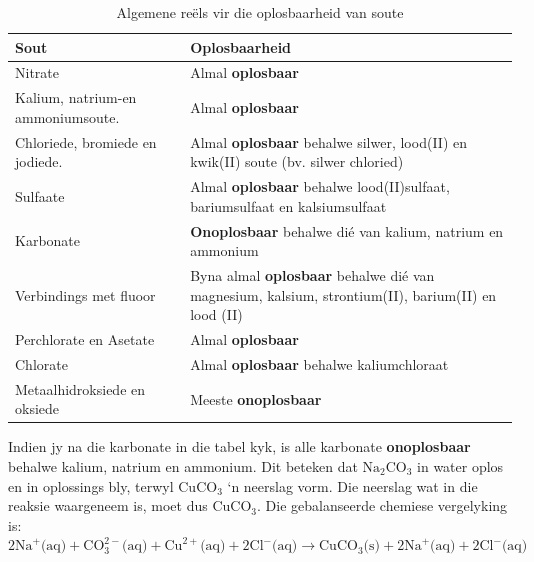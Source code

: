           \begin{table}[H]
        \begin{center}
      \label{m38719*uid69}
    \noindent
      \begin{tabular}{|l|p{8cm}|}\hline
                \textbf{Sout}
               &
                \textbf{Oplosbaarheid} \\ \hline
        Nitrate &
        Almal \textbf{oplosbaar} \\ \hline
        Kalium, natrium-en ammoniumsoute. &
        Almal \textbf{oplosbaar} \\ \hline
        Chloriede, bromiede en jodiede. &
        Almal \textbf{oplosbaar} behalwe silwer, lood(II) en kwik(II) soute (bv. silwer chloried)  \\ \hline
        Sulfaate &
        Almal \textbf{oplosbaar} behalwe lood(II)sulfaat, bariumsulfaat en kalsiumsulfaat \\ \hline
        Karbonate &
        \textbf{Onoplosbaar} behalwe dié van kalium, natrium en ammonium \\ \hline
        Verbindings met fluoor &
        Byna almal \textbf{oplosbaar} behalwe dié van magnesium, kalsium, strontium(II), barium(II) en lood (II) \\ \hline
        Perchlorate en Asetate &
        Almal \textbf{oplosbaar} \\ \hline
        Chlorate &
        Almal \textbf{oplosbaar} behalwe kaliumchloraat \\ \hline
        Metaalhidroksiede en oksiede &
        Meeste \textbf{onoplosbaar} \\ \hline
    \end{tabular}
      \end{center}
    \caption{Algemene re\"{e}ls vir die oplosbaarheid van soute}
\label{tab:solubility}
\end{table}
Indien jy na die karbonate in die tabel kyk, is alle karbonate \textbf{onoplosbaar} behalwe kalium, natrium en ammonium. Dit beteken dat $\text{Na}_{2}\text{CO}_3$ in water oplos en in oplossings bly, terwyl $\text{CuCO}_3$ ‘n neerslag vorm. Die neerslag wat in die reaksie waargeneem is, moet dus $\text{CuCO}_3$. Die gebalanseerde chemiese vergelyking is:\\
$2\text{Na}^{+} \text{(aq)} + \text{CO}_{3}^{2-} \text{(aq)} + \text{Cu}^{2+} \text{(aq)} + 2\text{Cl}^{-} \text{(aq)} \to \text{CuCO}_{3} \text{(s)} +  2\text{Na}^{+} \text{(aq)} + 2\text{Cl}^{-} \text{(aq)}$ \\
